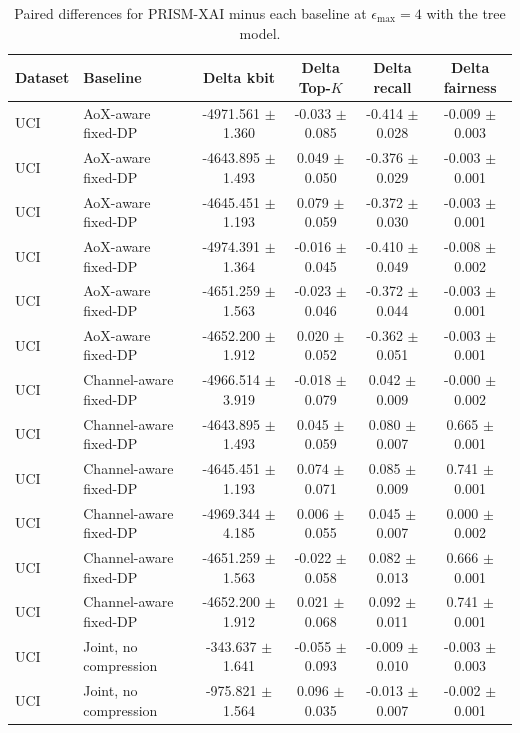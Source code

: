 \begin{table}[t]
\caption{Paired differences for PRISM-XAI minus each baseline at $\epsilon_{\max}=4$ with the tree model.}
\label{tab:paired-differences}
\centering
\scriptsize
\setlength{\tabcolsep}{3pt}
\begin{tabular}{llcccc}
\toprule
Dataset & Baseline & Delta kbit & Delta Top-$K$ & Delta recall & Delta fairness \\
\midrule
UCI & AoX-aware fixed-DP & -4971.561 $\pm$ 1.360 & -0.033 $\pm$ 0.085 & -0.414 $\pm$ 0.028 & -0.009 $\pm$ 0.003 \\
UCI & AoX-aware fixed-DP & -4643.895 $\pm$ 1.493 & 0.049 $\pm$ 0.050 & -0.376 $\pm$ 0.029 & -0.003 $\pm$ 0.001 \\
UCI & AoX-aware fixed-DP & -4645.451 $\pm$ 1.193 & 0.079 $\pm$ 0.059 & -0.372 $\pm$ 0.030 & -0.003 $\pm$ 0.001 \\
UCI & AoX-aware fixed-DP & -4974.391 $\pm$ 1.364 & -0.016 $\pm$ 0.045 & -0.410 $\pm$ 0.049 & -0.008 $\pm$ 0.002 \\
UCI & AoX-aware fixed-DP & -4651.259 $\pm$ 1.563 & -0.023 $\pm$ 0.046 & -0.372 $\pm$ 0.044 & -0.003 $\pm$ 0.001 \\
UCI & AoX-aware fixed-DP & -4652.200 $\pm$ 1.912 & 0.020 $\pm$ 0.052 & -0.362 $\pm$ 0.051 & -0.003 $\pm$ 0.001 \\
UCI & Channel-aware fixed-DP & -4966.514 $\pm$ 3.919 & -0.018 $\pm$ 0.079 & 0.042 $\pm$ 0.009 & -0.000 $\pm$ 0.002 \\
UCI & Channel-aware fixed-DP & -4643.895 $\pm$ 1.493 & 0.045 $\pm$ 0.059 & 0.080 $\pm$ 0.007 & 0.665 $\pm$ 0.001 \\
UCI & Channel-aware fixed-DP & -4645.451 $\pm$ 1.193 & 0.074 $\pm$ 0.071 & 0.085 $\pm$ 0.009 & 0.741 $\pm$ 0.001 \\
UCI & Channel-aware fixed-DP & -4969.344 $\pm$ 4.185 & 0.006 $\pm$ 0.055 & 0.045 $\pm$ 0.007 & 0.000 $\pm$ 0.002 \\
UCI & Channel-aware fixed-DP & -4651.259 $\pm$ 1.563 & -0.022 $\pm$ 0.058 & 0.082 $\pm$ 0.013 & 0.666 $\pm$ 0.001 \\
UCI & Channel-aware fixed-DP & -4652.200 $\pm$ 1.912 & 0.021 $\pm$ 0.068 & 0.092 $\pm$ 0.011 & 0.741 $\pm$ 0.001 \\
UCI & Joint, no compression & -343.637 $\pm$ 1.641 & -0.055 $\pm$ 0.093 & -0.009 $\pm$ 0.010 & -0.003 $\pm$ 0.003 \\
UCI & Joint, no compression & -975.821 $\pm$ 1.564 & 0.096 $\pm$ 0.035 & -0.013 $\pm$ 0.007 & -0.002 $\pm$ 0.001 \\

\end{tabular}
\end{table}
